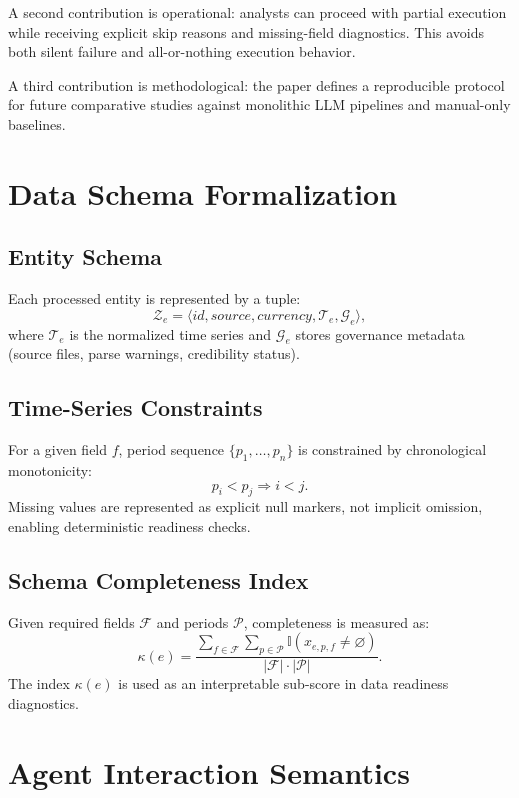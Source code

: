 \documentclass[conference]{IEEEtran}
\begin{document}
A second contribution is operational: analysts can proceed with partial execution while receiving explicit skip reasons and missing-field diagnostics. This avoids both silent failure and all-or-nothing execution behavior.

A third contribution is methodological: the paper defines a reproducible protocol for future comparative studies against monolithic LLM pipelines and manual-only baselines.

\section{Data Schema Formalization}
\subsection{Entity Schema}
Each processed entity is represented by a tuple:
\begin{equation}
\mathcal{Z}_e=\langle id,source,currency,\mathcal{T}_e,\mathcal{G}_e\rangle,
\end{equation}
where $\mathcal{T}_e$ is the normalized time series and $\mathcal{G}_e$ stores governance metadata (source files, parse warnings, credibility status).

\subsection{Time-Series Constraints}
For a given field $f$, period sequence $\{p_1,\ldots,p_n\}$ is constrained by chronological monotonicity:
\begin{equation}
p_i < p_j \Rightarrow i<j.
\end{equation}
Missing values are represented as explicit null markers, not implicit omission, enabling deterministic readiness checks.

\subsection{Schema Completeness Index}
Given required fields $\mathcal{F}$ and periods $\mathcal{P}$, completeness is measured as:
\begin{equation}
\kappa(e)=\frac{\sum_{f\in\mathcal{F}}\sum_{p\in\mathcal{P}}\mathbb{I}(x_{e,p,f}\neq\varnothing)}{|\mathcal{F}|\cdot|\mathcal{P}|}.
\end{equation}
The index $\kappa(e)$ is used as an interpretable sub-score in data readiness diagnostics.

\section{Agent Interaction Semantics}
\end{document}
